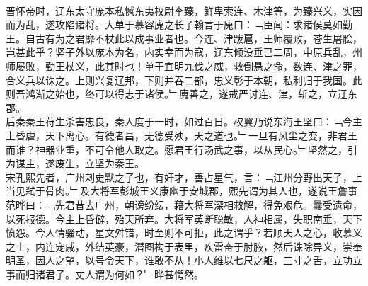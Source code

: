 \\
晋怀帝时，辽东太守庞本私憾东夷校尉李臻，鲜卑索连、木津等，为臻兴义，实因而为乱，遂攻陷诸将。大单于慕容廆之长子翰言于廆曰：﹁臣闻：求诸侯莫如勤王。自古有为之君靡不杖此以成事业者也。今连、津跋扈，王师覆败，苍生屠脍，岂甚此乎？竖子外以庞本为名，内实幸而为寇，辽东倾没垂已二周，中原兵乱，州师屡败，勤王杖义，此其时也！单于宜明九伐之威，救倒悬之命，数连、津之罪，合义兵以诛之。上则兴复辽邦，下则并吞二部，忠义彰于本朝，私利归于我国。此则吾鸿渐之始也，终可以得志于诸侯。﹂廆善之，遂戒严讨连、津，斩之，立辽东郡。
\\
后秦秦王苻生杀害忠良，秦人度于一时，如过百日。权翼乃说东海王坚曰：﹁今主上昏虐，天下离心。有德者昌，无德受殃，天之道也。﹂一旦有风尘之变，非君王而谁？神器业重，不可令他人取之。愿君王行汤武之事，以从民心。﹂坚然之，引为谋主，遂废生，立坚为秦王。
\\
宋孔熙先者，广州刺史默之子也，有奸才，善占星气，言：﹁江州分野出天子，上当见弒于骨肉。﹂及大将军彭城王义康幽于安城郡，熙先谓为其人也，遂说王詹事范晔曰：﹁先君昔去广州，朝谤纷纭，藉大将军深相救解，得免艰危。曩受遗命，以死报德。今主上昏僻，殆天所弃。大将军英断聪敏，人神相属，失职南垂，天下愤怨。今人情骚动，星文舛错，时至则不可拒，此之谓乎？若顺天人之心，收慕义之士，内连宠戚，外结英豪，潜图构于表里，疾雷奋于肘腋，然后诛除异义，崇奉明圣，因人之望，以号令天下，谁敢不从！小人维以七尺之躯，三寸之舌，立功立事而归诸君子。丈人谓为何如？﹂晔甚愕然。\\

